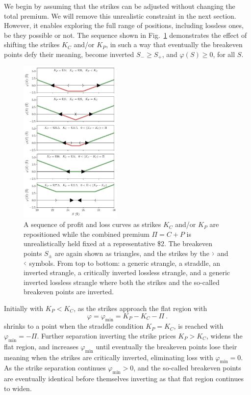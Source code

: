 \documentclass[aps,reprint]{revtex4-2}
\begin{document}
We begin by assuming that the strikes can be adjusted without changing the total premium.
We will remove this unrealistic constraint in the next section. However, it enables 
exploring the full range of positions, including lossless ones, be they possible or not.
The sequence shown in Fig.~\ref{fig:sequence} demonstrates the effect of shifting the strikes $K_C$ and/or $K_P$,  in such a way that eventually the breakeven points defy their meaning, become inverted $S_- \ge S_+$, and $\varphi(S) \ge 0$, for all $S$.
\begin{figure}[htb]
    \centering
    \includegraphics[width=0.45\textwidth]{figs/strangle_sequence.pdf}
\caption{
    A sequence of profit and loss curves as strikes $K_C$ and/or $K_P$ are repositioned while the combined premium $\Pi = C+P$ is unrealistically held fixed at a representative \$2. The breakeven points $S_\pm$ are again shown as triangles, and the strikes by the $ \scalebox{0.5}[1]{$>$} $ and $\scalebox{0.5}[1]{$<$}$ symbols.
    From top to bottom:
    a generic strangle,
    a straddle,
    an inverted strangle,
    a critically inverted lossless strangle,
    and a generic inverted lossless strangle where both the strikes and the so-called breakeven points are inverted. 
}
    \label{fig:sequence}
\end{figure}
Initially with $K_P < K_C$, as the strikes approach the flat region with 
\begin{equation} \label{eq:minimum}
\varphi = \varphi_{\min} = K_P - K_C - \Pi~.
\end{equation}
shrinks to a point when the straddle condition $K_P = K_C$, is reached with $\varphi_{\min} = -\Pi$.
Further separation inverting the strike prices $K_P > K_C$, widens the flat region, and increases $\varphi_{\min}$ 
until eventually the breakeven points lose their meaning when the strikes are critically inverted, 
eliminating loss with $\varphi_{\min} = 0$.  
As the strike separation continues $\varphi_{\min} > 0$, and the so-called breakeven points are eventually identical before themselves inverting as that flat region continues to widen.
\end{document}
